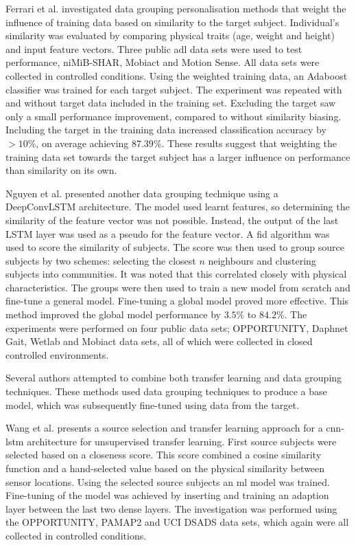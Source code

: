 Ferrari et al. investigated data grouping personalisation methods that weight the influence of training data based on similarity to the target subject. Individual's similarity was evaluated by comparing physical traits (age, weight and height) and input feature vectors. Three public \acrfull{adl} data sets were used to test performance, niMiB-SHAR\cite{Micucci2017}, Mobiact\cite{Vavoulas2016} and Motion Sense\cite{Katevas2014}. All data sets were collected in controlled conditions. Using the weighted training data, an Adaboost classifier was trained for each target subject. The experiment was repeated with and without target data included in the training set. Excluding the target saw only a small performance improvement, compared to without similarity biasing. Including the target in the training data increased classification accuracy by $>10\%$, on average achieving $87.39\%$. These results suggest that weighting the training data set towards the target subject has a larger influence on performance than similarity on its own.\cite{Ferrari2020}

Nguyen et al. presented another data grouping technique using a DeepConvLSTM architecture. The model used learnt features, so determining the similarity of the feature vector was not possible. Instead, the output of the last LSTM layer was used as a pseudo for the feature vector. A \acrfull{fid} algorithm was used to score the similarity of subjects. The score was then used to group source subjects by two schemes: selecting the closest $n$ neighbours and clustering subjects into communities. It was noted that this correlated closely with physical characteristics. The groups were then used to train a new model from scratch and fine-tune a general model. Fine-tuning a global model proved more effective. This method improved the global model performance by $3.5\%$ to $84.2\%$. The experiments were performed on four public data sets; OPPORTUNITY\cite{Roggen2009}, Daphnet Gait\cite{Sigcha2020}, Wetlab\cite{Scholl2015} and Mobiact\cite{Vavoulas2016} data sets, all of which were collected in closed controlled environments.\cite{Nguyen2021}

Several authors attempted to combine both transfer learning and data grouping techniques. These methods used data grouping techniques to produce a base model, which was subsequently fine-tuned using data from the target.

Wang et al. presents a source selection and transfer learning approach for a \acrshort{cnn}-\acrshort{lstm} architecture for unsupervised transfer learning. First source subjects were selected based on a closeness score. This score combined a cosine similarity function and a hand-selected value based on the physical similarity between sensor locations. Using the selected source subjects an \acrshort{ml} model was trained. Fine-tuning of the model was achieved by inserting and training an adaption layer between the last two dense layers. The investigation was performed using the OPPORTUNITY\cite{Roggen2009}, PAMAP2\cite{Reiss2012} and UCI DSADS\cite{Altun2010} data sets, which again were all collected in controlled conditions.\cite{Wang2018a}

